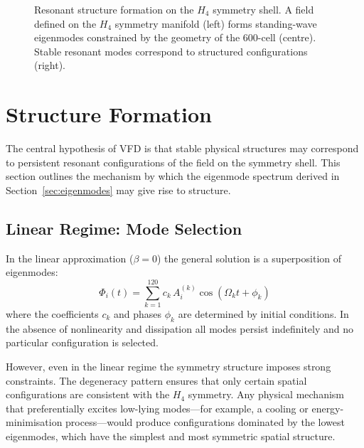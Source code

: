 \documentclass[12pt,a4paper]{article}
\newcommand{\Hfour}{H_4}
\begin{document}
\begin{figure}[H]
\caption{Resonant structure formation on the $\Hfour$ symmetry shell.  A field
defined on the $\Hfour$ symmetry manifold (left) forms standing-wave
eigenmodes constrained by the geometry of the 600-cell (centre).  Stable
resonant modes correspond to structured configurations (right).}
\label{fig:structure_formation}
\end{figure}


\section{Structure Formation}\label{sec:structure}

The central hypothesis of VFD is that stable physical structures may correspond to
persistent resonant configurations of the field on the symmetry shell.  This
section outlines the mechanism by which the eigenmode spectrum derived in
Section~\ref{sec:eigenmodes} may give rise to structure.

\subsection{Linear Regime: Mode Selection}

In the linear approximation ($\beta = 0$) the general solution is a
superposition of eigenmodes:
\begin{equation}\label{eq:superposition}
  \Phi_i(t) = \sum_{k=1}^{120} c_k\,A_i^{(k)}\cos(\Omega_k t + \phi_k)
\end{equation}
where the coefficients $c_k$ and phases $\phi_k$ are determined by initial
conditions.  In the absence of nonlinearity and dissipation all modes persist
indefinitely and no particular configuration is selected.

However, even in the linear regime the symmetry structure imposes strong
constraints.  The degeneracy pattern ensures that only certain spatial
configurations are consistent with the $\Hfour$ symmetry.  Any physical
mechanism that preferentially excites low-lying modes---for example, a cooling
or energy-minimisation process---would produce configurations dominated by the
lowest eigenmodes, which have the simplest and most symmetric spatial
structure.
\end{document}
